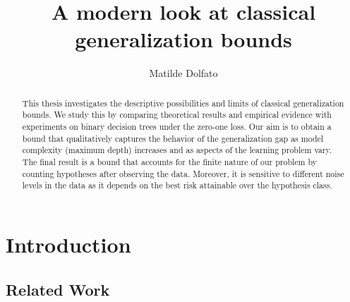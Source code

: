 \documentclass[reqno]{amsart}
\title{A modern look at classical generalization bounds}
\author{Matilde Dolfato}
\let\oldsection\section
\renewcommand{\section}{\clearpage\thispagestyle{plain}\oldsection}
\begin{document}
\begin{abstract}
This thesis investigates the descriptive possibilities and limits of classical generalization bounds. We study this by comparing theoretical results and empirical evidence with experiments on binary decision trees under the zero-one loss. Our aim is to obtain a bound that qualitatively captures the behavior of the generalization gap as model complexity (maximum depth) increases and as aspects of the learning problem vary. The final result is a bound that accounts for the finite nature of our problem by counting hypotheses after observing the data. Moreover, it is sensitive to different noise levels in the data as it depends on the best risk attainable over the hypothesis class. 
\end{abstract}

\maketitle

\newpage
\tableofcontents

\newpage
\section{Introduction}


\subsection{Related Work}

\end{document}

